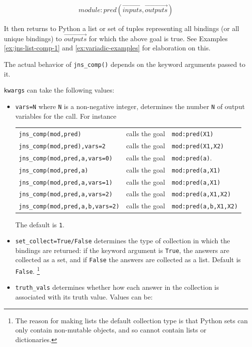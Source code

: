 \begin{description}
\[module:pred(\overrightarrow{inputs},\overrightarrow{outputs}) \]

It then returns to Python a list or set of tuples representing all
bindings (or all unique bindings) to $\overrightarrow{outputs}$ for
which the above goal is true.  See Examples \ref{ex:jns-list-comp-1}
and \ref{ex:variadic-examples} for elaboration on this.

The actual behavior of {\tt jns\_comp()} depends on the keyword
arguments passed to it.

{\tt kwargs} can take the following values:
\begin{itemize}
  \item {\tt vars=N} where {\tt N} is a non-negative integer,
    determines the number {\tt N} of output variables for the call.
    For instance
    
\begin{tabular}{lll}
    {\tt jns\_comp(mod,pred)}            & calls the goal & {\tt mod:pred(X1)} \\
    {\tt jns\_comp(mod,pred),vars=2}     & calls the goal & {\tt mod:pred(X1,X2)} \\
    {\tt jns\_comp(mod,pred,a,vars=0)}   & calls the goal & {\tt mod:pred(a)}. \\
    {\tt jns\_comp(mod,pred,a)}          & calls the goal & {\tt mod:pred(a,X1)} \\
    {\tt jns\_comp(mod,pred,a,vars=1)}   & calls the goal & {\tt mod:pred(a,X1)} \\
    {\tt jns\_comp(mod,pred,a,vars=2)}   & calls the goal & {\tt mod:pred(a,X1,X2)} \\
    {\tt jns\_comp(mod,pred,a,b,vars=2)} & calls the goal & {\tt mod:pred(a,b,X1,X2)} \\
\end{tabular}    
    
    \noindent
    The default is {\tt 1}.
    
    \item {\tt set\_collect=True/False} determines the type of
      collection in which the bindings are returned: if the keyword
      argument is {\tt True}, the answers are collected as a set, and
      if {\tt False} the answers are collected as a list.  Default is
      {\tt False}. \footnote{The reason for making lists the default
        collection type is that Python sets can only contain
        non-mutable objects, and so cannot contain lists or
        dictionaries.}
      
    \item {\tt truth\_vals} determines whether how each answer in the
      collection is associated with its truth value.  Values can be:
      

\end{itemize}
\end{description}
